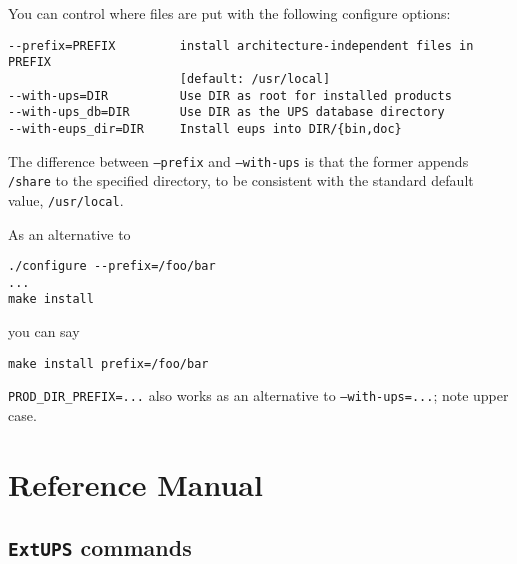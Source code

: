 \documentclass{article}
\newcommand{\code}[1]{\texttt{#1}}
\newcommand{\eups}{\code{ExtUPS}}
\begin{document}
You can control where files are put with the following configure options:
\begin{verbatim}
--prefix=PREFIX         install architecture-independent files in PREFIX
                        [default: /usr/local]
--with-ups=DIR          Use DIR as root for installed products
--with-ups_db=DIR       Use DIR as the UPS database directory
--with-eups_dir=DIR     Install eups into DIR/{bin,doc}
\end{verbatim}
The difference between \texttt{--prefix} and \texttt{--with-ups}
is that the former appends \texttt{/share} to the specified directory, to
be consistent with the standard default value, \texttt{/usr/local}.
  
As an alternative to
\begin{verbatim}
./configure --prefix=/foo/bar
...
make install
\end{verbatim}
you can say
\begin{verbatim}
make install prefix=/foo/bar
\end{verbatim}
\texttt{PROD\_DIR\_PREFIX=...} also works as an alternative to \texttt{--with-ups=...};
note upper case.
  
\section{Reference Manual}

\subsection{\eups{} commands}
\end{document}
